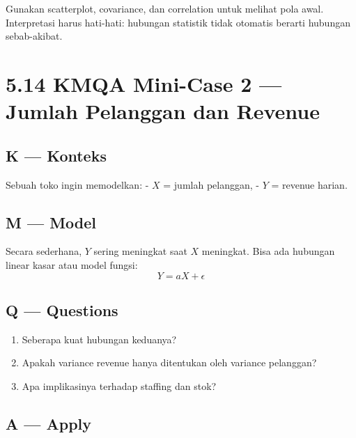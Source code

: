 \documentclass[
  letterpaper,
  DIV=11,
  numbers=noendperiod]{scrreprt}
\providecommand{\tightlist}{%
  \setlength{\itemsep}{0pt}\setlength{\parskip}{0pt}}
\begin{document}
Gunakan scatterplot, covariance, dan correlation untuk melihat pola
awal. Interpretasi harus hati-hati: hubungan statistik tidak otomatis
berarti hubungan sebab-akibat.

\section{5.14 KMQA Mini-Case 2 --- Jumlah Pelanggan dan
Revenue}\label{kmqa-mini-case-2-jumlah-pelanggan-dan-revenue}

\subsection{K --- Konteks}\label{k-konteks-41}

Sebuah toko ingin memodelkan: - \(X\) = jumlah pelanggan, - \(Y\) =
revenue harian.

\subsection{M --- Model}\label{m-model-41}

Secara sederhana, \(Y\) sering meningkat saat \(X\) meningkat. Bisa ada
hubungan linear kasar atau model fungsi: \[
Y = aX + \epsilon
\]

\subsection{Q --- Questions}\label{q-questions-41}

\begin{enumerate}
\def\labelenumi{\arabic{enumi}.}
\tightlist
\item
  Seberapa kuat hubungan keduanya?
\item
  Apakah variance revenue hanya ditentukan oleh variance pelanggan?
\item
  Apa implikasinya terhadap staffing dan stok?
\end{enumerate}

\subsection{A --- Apply}\label{a-apply-40}
\end{document}
